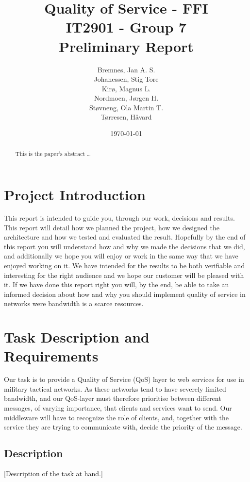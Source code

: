 \documentclass[12pt]{article}
\title{
    Quality of Service - FFI \\
    IT2901 - Group 7  \\ 
    Preliminary Report \\
}
\author{
    Bremnes, Jan A. S. \\  
    Johanessen, Stig Tore \\
    Kirø, Magnus L.\\
    Nordmoen, Jørgen H.\\ 
    Støvneng, Ola Martin T.\\
    Tørresen, Håvard \\
}
\date{\today}
\begin{document}
\maketitle
\titlepage
{}
\newpage

\begin{abstract}\label{abstract}
This is the paper's abstract \ldots
\end{abstract}

\tableofcontents
\listoffigures
\listoftables
\newpage

\section{Project Introduction}\label{intoduction}
    This report is intended to guide you, through our work, decisions and results. This report will detail how we planned the project, how we designed the architecture and how we tested and evaluated the result. Hopefully by the end of this report you will understand how and why we made the decisions that we did, and additionally we hope you will enjoy or work in the same way that we have enjoyed working on it. We have intended for the results to be both verifiable and interesting for the right audience and we hope our customer will be pleased with it. If we have done this report right you will, by the end, be able to take an informed decision about how and why you should implement quality of service in networks were bandwidth is a scarce resources.

\section{Task Description and Requirements}\label{taskdescreq} 
    Our task is to provide a Quality of Service (QoS) layer to web services for use in military tactical networks. As these networks tend to have severely limited bandwidth, and our QoS-layer must therefore prioritise between different messages, of varying importance, that clients and services want to send. Our middleware will have to recognize the role of clients, and, together with the service they are trying to communicate with, decide the priority of the message.
    
    \subsection{Description}\label{taskdesc} 
    [Description of the task at hand.]
        
\end{document}
